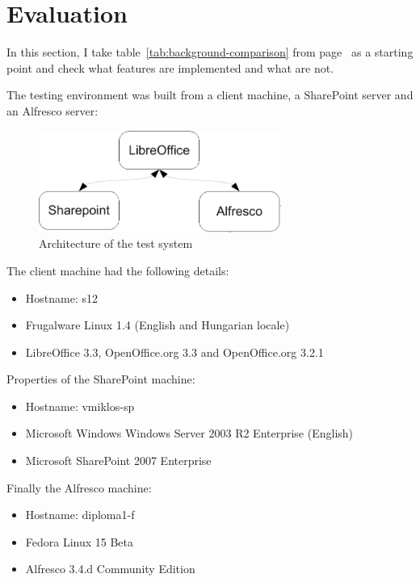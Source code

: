 \section{Evaluation}

In this section, I take table~\ref{tab:background-comparison} from
page~\pageref{tab:background-comparison} as a starting point and check what
features are implemented and what are not.

The testing environment was built from a client machine, a SharePoint server
and an Alfresco server:

\begin{figure}[H]
\centering
\includegraphics[width=300px,keepaspectratio]{test-arch.pdf}
\caption{Architecture of the test system}
\end{figure}

The client machine had the following details:
\begin{itemize}
\item Hostname: s12
\item Frugalware Linux 1.4 (English and Hungarian locale)
\item LibreOffice 3.3, OpenOffice.org 3.3 and OpenOffice.org 3.2.1
\end{itemize}

Properties of the SharePoint machine:

\begin{itemize}
\item Hostname: vmiklos-sp
\item Microsoft Windows Windows Server 2003 R2 Enterprise (English)
\item Microsoft SharePoint 2007 Enterprise
\end{itemize}

Finally the Alfresco machine:

\begin{itemize}
\item Hostname: diploma1-f
\item Fedora Linux 15 Beta
\item Alfresco 3.4.d Community Edition
\end{itemize}

